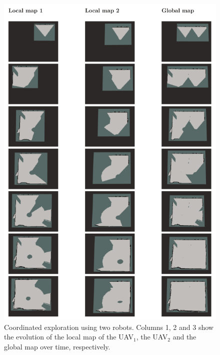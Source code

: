 \documentclass[11pt,openany]{book}
\begin{document}
\begin{figure}[H]
    \centering
    \includegraphics[scale=0.5]{assets/3_14.png}
    \caption{Coordinated exploration using two robots. Columns 1, 2 and 3 show the evolution of the local map of the UAV$_1$, the UAV$_2$ and the global map over time, respectively.}
    \label{fig:3.14}
\end{figure}
\end{document}
